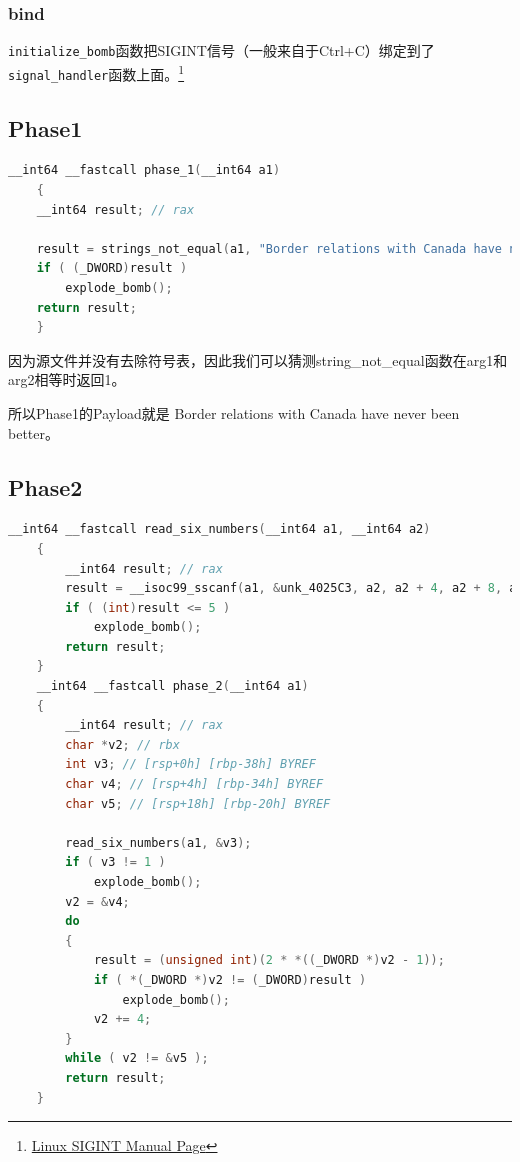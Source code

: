 \documentclass[a4pper,12pt,onecolumn]{article}
\begin{document}
\subsubsection{bind}

 \texttt{initialize\_bomb}函数把SIGINT信号（一般来自于Ctrl+C）绑定到了 \texttt{signal\_handler}函数上面。\footnote{\href{https://man7.org/linux/man-pages/man3/siginterrupt.3.html}{Linux SIGINT Manual Page}}

\subsection{Phase1}

\begin{lstlisting}[language=c, caption=Discompile by IDA Pro]
    __int64 __fastcall phase_1(__int64 a1)
    {
    __int64 result; // rax

    result = strings_not_equal(a1, "Border relations with Canada have never been better.");
    if ( (_DWORD)result )
        explode_bomb();
    return result;
    }
\end{lstlisting}

因为源文件并没有去除符号表，因此我们可以猜测string\_not\_equal函数在arg1和arg2相等时返回1。

所以Phase1的Payload就是 Border relations with Canada have never been better。

\subsection{Phase2}

\begin{lstlisting}[language=c, caption=Discompile by IDA Pro]
    __int64 __fastcall read_six_numbers(__int64 a1, __int64 a2)
    {
        __int64 result; // rax
        result = __isoc99_sscanf(a1, &unk_4025C3, a2, a2 + 4, a2 + 8, a2 + 12, a2 + 16, a2 + 20);
        if ( (int)result <= 5 )
            explode_bomb();
        return result;
    }
    __int64 __fastcall phase_2(__int64 a1)
    {
        __int64 result; // rax
        char *v2; // rbx
        int v3; // [rsp+0h] [rbp-38h] BYREF
        char v4; // [rsp+4h] [rbp-34h] BYREF
        char v5; // [rsp+18h] [rbp-20h] BYREF

        read_six_numbers(a1, &v3);
        if ( v3 != 1 )
            explode_bomb();
        v2 = &v4;
        do
        {
            result = (unsigned int)(2 * *((_DWORD *)v2 - 1));
            if ( *(_DWORD *)v2 != (_DWORD)result )
                explode_bomb();
            v2 += 4;
        }
        while ( v2 != &v5 );
        return result;
    }
\end{lstlisting}
\end{document}
